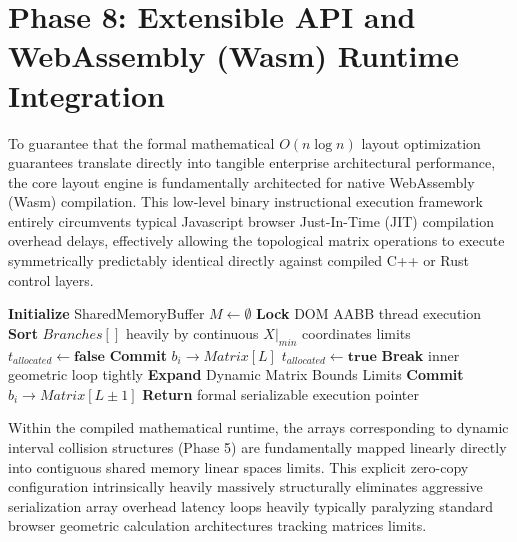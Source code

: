 \documentclass[fleqn,10pt]{wlscirep}
\begin{document}
\section*{Phase 8: Extensible API and WebAssembly (Wasm) Runtime Integration}
To guarantee that the formal mathematical $O(n \log n)$ layout optimization guarantees translate directly into tangible enterprise architectural performance, the core layout engine is fundamentally architected for native WebAssembly (Wasm) compilation. This low-level binary instructional execution framework entirely circumvents typical Javascript browser Just-In-Time (JIT) compilation overhead delays, effectively allowing the topological matrix operations to execute symmetrically predictably identical directly against compiled C++ or Rust control layers.

\begin{algorithm*}
\caption{Optimized Continuous WebAssembly Interval Allocation Pass}\label{alg:wasm_lane}
\begin{algorithmic}[1]
    \State \textbf{Initialize} SharedMemoryBuffer $M \gets \emptyset$ 
    \State \textbf{Lock} DOM AABB thread execution 
    \State \textbf{Sort} $Branches[]$ heavily by continuous $X|_{min}$ coordinates limits
        \State $t_{allocated} \gets \textbf{false}$
                \State \textbf{Commit} $b_i \to Matrix[L]$
                \State $t_{allocated} \gets \textbf{true}$
                \State \textbf{Break} inner geometric loop tightly
            \EndIf
        \EndFor
            \State \textbf{Expand} Dynamic Matrix Bounds Limits
            \State \textbf{Commit} $b_i \to Matrix[L \pm 1]$
        \EndIf
    \EndFor
    \State \textbf{Return} formal serializable execution pointer
\EndProcedure
\end{algorithmic}
\end{algorithm*}

Within the compiled mathematical runtime, the arrays corresponding to dynamic interval collision structures (Phase 5) are fundamentally mapped linearly directly into contiguous shared memory linear spaces limits. This explicit zero-copy configuration intrinsically heavily massively structurally eliminates aggressive serialization array overhead latency loops heavily typically paralyzing standard browser geometric calculation architectures tracking matrices limits.
\end{document}
